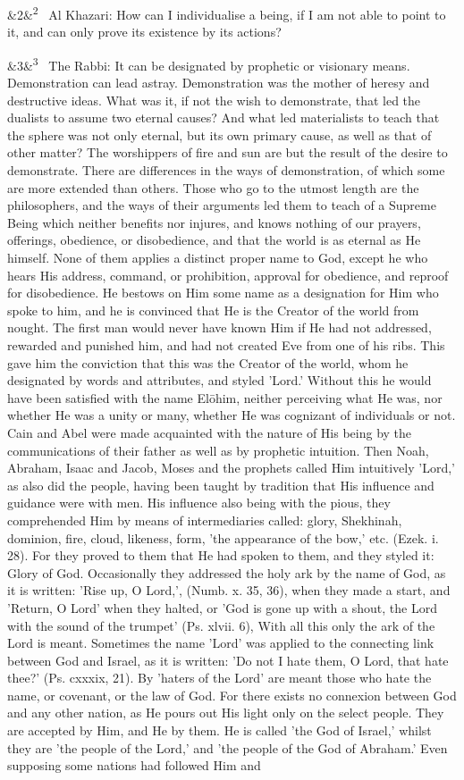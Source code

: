 \documentclass[12pt]{article}
\newcommand{\para}[1][]{\par\noindent\ifx&#1&\else\textsuperscript{\footnotesize #1}~\fi}
\begin{document}
\para[2] Al Khazari: How can I individualise a being, if I am not able to point to it, and can only prove its existence by its actions?

\para[3] The Rabbi: It can be designated by prophetic or visionary means. Demonstration can lead astray. Demonstration was the mother of heresy and destructive ideas. What was it, if not the wish to demonstrate, that led the dualists to assume two eternal causes? And what led materialists to teach that the sphere was not only eternal, but its own primary cause, as well as that of other matter? The worshippers of fire and sun are but the result of the desire to demonstrate. There are differences in the ways of demonstration, of which some are more extended than others. Those who go to the utmost length are the philosophers, and the ways of their arguments led them to teach of a Supreme Being which neither benefits nor injures, and knows nothing of our prayers, offerings, obedience, or disobedience, and that the world is as eternal as He himself. None of them applies a distinct proper name to God, except he who hears His address, command, or prohibition, approval for obedience, and reproof for disobedience. He bestows on Him some name as a designation for Him who spoke to him, and he is convinced that He is the Creator of the world from nought. The first man would never have known Him if He had not addressed, rewarded and punished him, and had not created Eve from one of his ribs. This gave him the conviction that this was the Creator of the world, whom he designated by words and attributes, and styled 'Lord.' Without this he would have been satisfied with the name Elōhim, neither perceiving what He was, nor whether He was a unity or many, whether He was cognizant of individuals or not. Cain and Abel were made acquainted with the nature of His being by the communications of their father as well as by prophetic intuition. Then Noah, Abraham, Isaac and Jacob, Moses and the prophets called Him intuitively 'Lord,' as also did the people, having been taught by tradition that His influence and guidance were with men. His influence also being with the pious, they comprehended Him by means of intermediaries called: glory, Shekhinah, dominion, fire, cloud, likeness, form, 'the appearance of the bow,' etc. (Ezek. i. 28). For they proved to them that He had spoken to them, and they styled it: Glory of God. Occasionally they addressed the holy ark by the name of God, as it is written: 'Rise up, O Lord,', (Numb. x. 35, 36), when they made a start, and 'Return, O Lord' when they halted, or 'God is gone up with a shout, the Lord with the sound of the trumpet' (Ps. xlvii. 6), With all this only the ark of the Lord is meant. Sometimes the name 'Lord' was applied to the connecting link between God and Israel, as it is written: 'Do not I hate them, O Lord, that hate thee?' (Ps. cxxxix, 21). By 'haters of the Lord' are meant those who hate the name, or covenant, or the law of God. For there exists no connexion between God and any other nation, as He pours out His light only on the select people. They are accepted by Him, and He by them. He is called 'the God of Israel,' whilst they are 'the people of the Lord,' and 'the people of the God of Abraham.' Even supposing some nations had followed Him and 
\end{document}
